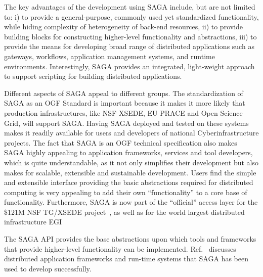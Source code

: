 \documentclass{sig-alternate}
\begin{document}

The key advantages of the development using SAGA include, but are not
limited to: i) to provide a general-purpose, commonly used yet
standardized functionality, while hiding complexity of heterogeneity
of back-end resources, ii) to provide building blocks for constructing
higher-level functionality and abstractions, iii) to provide the means
for developing broad range of distributed applications such as
gateways, workflows, application management systems, and runtime
environments. Interestingly, SAGA provides an integrated, light-weight
approach to support scripting for building distributed applications.

Different aspects of SAGA appeal to different groups. The
standardization of SAGA as an OGF Standard is important because it
makes it more likely that production infrastructures, like NSF XSEDE,
EU PRACE and Open Science Grid, will support SAGA. Having SAGA
deployed and tested on these systems makes it readily available for
users and developers of national Cyberinfrastructure projects. The
fact that SAGA is an OGF technical specification also makes SAGA
highly appealing to application frameworks, services and tool
developers, which is quite understandable, as it not only simplifies
their development but also makes for scalable, extensible and
sustainable development. Users find the simple and extensible
interface providing the basic abstractions required for distributed
computing is very appealing to add their own ``functionality'' to a
core base of functionality. Furthermore, SAGA is now part of the
``official'' access layer for the \$121M NSF TG/XSEDE
project~\cite{XSEDE}, as well as for the world largest distributed
infrastructure EGI~\cite{EGI}

The SAGA API provides the base abstractions upon which tools and
frameworks that provide higher-level functionality can be
implemented. Ref.~\cite{saga_url} discusses distributed application
frameworks and run-time systems that SAGA has been used to develop
successfully. 
\end{document}
